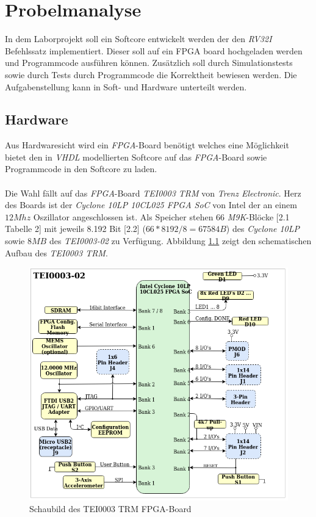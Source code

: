 \chapter{Probelmanalyse}

    In dem Laborprojekt soll ein Softcore entwickelt werden der den \textit{RV32I} Befehlssatz implementiert.
    Dieser soll auf ein FPGA board hochgeladen werden und Programmcode ausführen können.
    Zusätzlich soll durch Simulationstests sowie durch Tests durch Programmcode die Korrektheit
    bewiesen werden.
    Die Aufgabenstellung kann in Soft- und Hardware unterteilt werden.

        \section{Hardware}\label{lab:hardware}
            Aus Hardwaresicht wird ein \textit{FPGA}-Board benötigt welches eine Möglichkeit bietet
            den in \textit{VHDL} modellierten Softcore auf das \textit{FPGA}-Board sowie Programmcode
            in den Softcore zu laden.
            \\\\
            Die Wahl fällt auf das \textit{FPGA}-Board \textit{TEI0003 TRM} von \textit{Trenz Electronic}.
            Herz des Boards ist der \textit{Cyclone 10LP 10CL025 FPGA SoC} von Intel der an einem $12 Mhz$
            Oszillator angeschlossen ist. 
            Als Speicher stehen 66 \textit{M9K}-Blöcke \cite{intel-cyc10lp-io-datasheet}[2.1 Tabelle 2] mit jeweils 8.192 Bit
            \cite{intel-cyc10lp-io-datasheet}[2.2] ($66*8192/8 = 67584B$) des \textit{Cyclone 10LP} sowie $8 MB$ des \textit{TEI0003-02} zu Verfügung.
            Abbildung \ref{fig:fpga_schematic} zeigt den schematischen Aufbau des \textit{TEI0003 TRM}.
            \begin{figure}[H]
                \centering
                \includegraphics[scale=0.5]{img/fpga_board_schematic.png}
                \caption[Schaubild des TEI0003 TRM FPGA-Board]{Schaubild des TEI0003 TRM FPGA-Board \cite{terz} }
                \label{fig:fpga_schematic}
            \end{figure}


